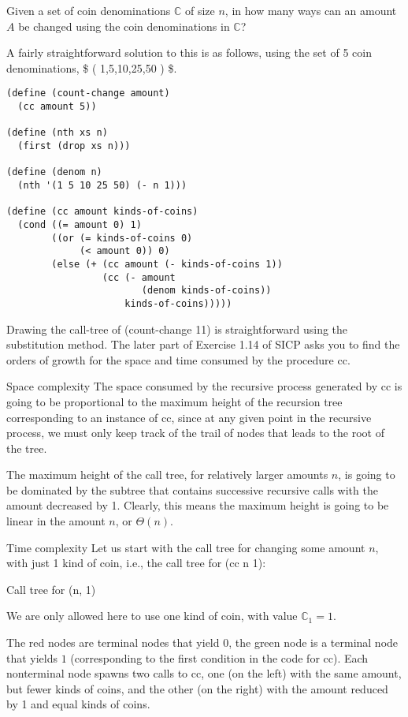 \documentclass[
]{article}
\author{}
\date{}
\begin{document}
Given a set of coin denominations \(\mathbb{C}\) of size \(n\), in how
many ways can an amount \(A\) be changed using the coin denominations in
\(\mathbb{C}\)?

A fairly straightforward solution to this is as follows, using the set
of 5 coin denominations, \$ \left( 1,5,10,25,50 \right) \$.

\begin{verbatim}
(define (count-change amount)
  (cc amount 5))

(define (nth xs n)
  (first (drop xs n)))

(define (denom n)
  (nth '(1 5 10 25 50) (- n 1)))

(define (cc amount kinds-of-coins)
  (cond ((= amount 0) 1)
        ((or (= kinds-of-coins 0)
             (< amount 0)) 0)
        (else (+ (cc amount (- kinds-of-coins 1))
                 (cc (- amount
                        (denom kinds-of-coins))
                     kinds-of-coins)))))
\end{verbatim}

Drawing the call-tree of (count-change 11) is straightforward using the
substitution method. The later part of Exercise 1.14 of SICP asks you to
find the orders of growth for the space and time consumed by the
procedure cc.

Space complexity The space consumed by the recursive process generated
by cc is going to be proportional to the maximum height of the recursion
tree corresponding to an instance of cc, since at any given point in the
recursive process, we must only keep track of the trail of nodes that
leads to the root of the tree.

The maximum height of the call tree, for relatively larger amounts
\(n\), is going to be dominated by the subtree that contains successive
recursive calls with the amount decreased by 1. Clearly, this means the
maximum height is going to be linear in the amount \(n\), or
\(\Theta \left(n\right)\).

Time complexity Let us start with the call tree for changing some amount
\(n\), with just 1 kind of coin, i.e., the call tree for (cc n 1):

Call tree for (n, 1)

We are only allowed here to use one kind of coin, with value
\(\mathbb{C}_{1} = 1\).

The red nodes are terminal nodes that yield \(0\), the green node is a
terminal node that yields \(1\) (corresponding to the first condition in
the code for cc). Each nonterminal node spawns two calls to cc, one (on
the left) with the same amount, but fewer kinds of coins, and the other
(on the right) with the amount reduced by 1 and equal kinds of coins.
\end{document}
